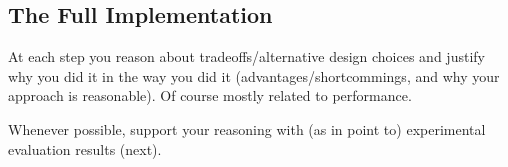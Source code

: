 \subsection{The Full Implementation}
\label{sec:full}
At each step you reason about tradeoffs/alternative design choices and
justify why you did it in the way you did it (advantages/shortcommings,
and why your approach is reasonable). Of course mostly related to performance.

Whenever possible, support your reasoning with (as in point to) experimental
evaluation results (next).
